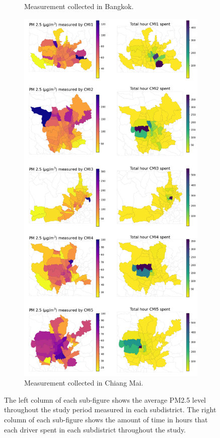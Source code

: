 \begin{figure}[t]
\begin{subfigure}[t]{0.49\textwidth}
        \caption{Measurement collected in Bangkok.}
    \end{subfigure}%
    \hfill
    \begin{subfigure}[t]{0.49\textwidth}
        \centering
        \includegraphics[width=\linewidth]{figures/map/CMI_PM_TIME.png}%
        \caption{Measurement collected in Chiang Mai.}
    \end{subfigure}%

    \caption{
    The left column of each sub-figure shows the average PM2.5 level throughout the study period measured in each subdistrict.
    The right column of each sub-figure shows the amount of time in hours that each driver spent in each subdistrict throughout the study.
    }
    \Description{}
    \label{fig:subdistrict-aqi}
\end{figure}


 
